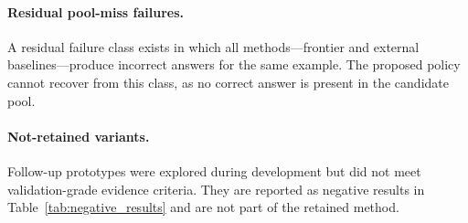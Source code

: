 \paragraph{Residual pool-miss failures.}
A residual failure class exists in which all methods---frontier and external
baselines---produce incorrect answers for the same example.
The proposed policy cannot recover from this class, as no correct answer is
present in the candidate pool.

\paragraph{Not-retained variants.}
Follow-up prototypes were explored during development but did not meet
validation-grade evidence criteria.
They are reported as negative results in Table~\ref{tab:negative_results} and
are not part of the retained method.
